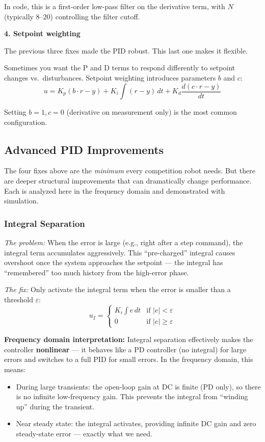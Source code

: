 In code, this is a first-order low-pass filter on the derivative term, with $N$ (typically 8--20) controlling the filter cutoff.

\textbf{4. Setpoint weighting}

The previous three fixes made the PID robust. This last one makes it flexible.

Sometimes you want the P and D terms to respond differently to setpoint changes vs.\ disturbances. Setpoint weighting introduces parameters $b$ and $c$:
\begin{equation}
u = K_p(b \cdot r - y) + K_i \int (r - y) \, dt + K_d \frac{d(c \cdot r - y)}{dt}
\end{equation}

Setting $b = 1, c = 0$ (derivative on measurement only) is the most common configuration.

\subsection{Advanced PID Improvements}

The four fixes above are the \textit{minimum} every competition robot needs. But there are deeper structural improvements that can dramatically change performance. Each is analyzed here in the frequency domain and demonstrated with simulation.

\subsubsection{Integral Separation}

\textit{The problem:} When the error is large (e.g., right after a step command), the integral term accumulates aggressively. This ``pre-charged'' integral causes overshoot once the system approaches the setpoint --- the integral has ``remembered'' too much history from the high-error phase.

\textit{The fix:} Only activate the integral term when the error is smaller than a threshold $\varepsilon$:
\begin{equation}
u_I = \begin{cases} K_i \int e \, dt & \text{if } |e| < \varepsilon \\ 0 & \text{if } |e| \geq \varepsilon \end{cases}
\end{equation}

\textbf{Frequency domain interpretation:} Integral separation effectively makes the controller \textbf{nonlinear} --- it behaves like a PD controller (no integral) for large errors and switches to a full PID for small errors. In the frequency domain, this means:
\begin{itemize}
    \item During large transients: the open-loop gain at DC is finite (PD only), so there is no infinite low-frequency gain. This prevents the integral from ``winding up'' during the transient.
    \item Near steady state: the integral activates, providing infinite DC gain and zero steady-state error --- exactly what we need.
\end{itemize}

